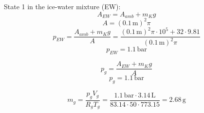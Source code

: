 State 1 in the ice-water mixture (EW):  
\[ A_{EW} = A_{amb} + m_{K} g \]  
\[ A = (0.1 \, \text{m})^2 \pi \]  
\[ p_{EW} = \frac{A_{amb} + m_{K} g}{A} = \frac{(0.1 \, \text{m})^2 \pi \cdot 10^5 + 32 \cdot 9.81}{(0.1 \, \text{m})^2 \pi} \]  
\[ p_{EW} = 1.1 \, \text{bar} \]  

\[ p_{g} = \frac{A_{EW} + m_{K} g}{A} \]  
\[ p_{g} = 1.1 \, \text{bar} \]  

\[ m_{g} = \frac{p_{g} V_{g}}{R_{g} T_{g}} = \frac{1.1 \, \text{bar} \cdot 3.14 \, \text{L}}{83.14 \cdot 50 \cdot 773.15} = 2.68 \, \text{g} \]